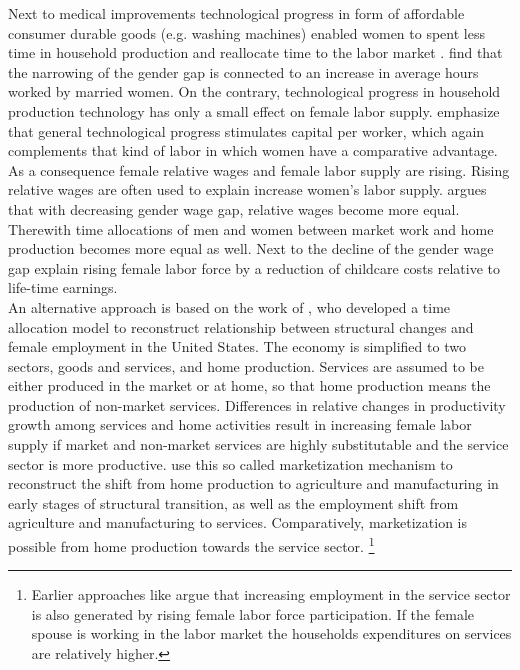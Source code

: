 \documentclass[a4paper,12pt]{article}
\begin{document}
Next to medical improvements technological progress in form of affordable consumer durable goods (e.g. washing machines) enabled women to spent less time in household production and reallocate time to the labor market \citep{Greenwood:2005}. \citet{Jones:2003} find that the narrowing of the gender gap is connected to an increase in average hours worked by married women. On the contrary, technological progress in household production technology has only a small effect on female labor supply.
\citet{Galor:1996} emphasize that general technological progress stimulates capital per worker, which again complements that kind of labor in which women have a comparative advantage. As a consequence female relative wages and female labor supply are rising. Rising relative wages are often used to explain increase women's labor supply. \citet{Siegel:2017} argues that with decreasing gender wage gap, relative wages become more equal. Therewith time allocations of men and women between market work and home production becomes more equal as well. Next to the decline of the gender wage gap \citet{Attanasio:2008} explain rising female labor force by a reduction of childcare costs relative to life-time earnings.\\
An alternative approach is based on the work of \citet{Akbulut:11}, who developed a time allocation model to reconstruct relationship between structural changes and female employment in the United States. The economy is simplified to two sectors, goods and services, and home production. Services are assumed to be either produced in the market or at home, so that home production means the production of non-market services. Differences in relative changes in productivity growth among services and home activities result in increasing female labor supply if market and non-market services are highly substitutable and the service sector is more productive. \citet{Ngai:2008} use this so called marketization mechanism to reconstruct the shift from home production to agriculture and manufacturing in early stages of structural transition, as well as the employment shift from agriculture and manufacturing to services. Comparatively, marketization is possible from home production towards the service sector. \footnote{Earlier approaches like \citet{Fuchs:1980} argue that increasing employment in the service sector is also generated by rising female labor force participation. If the female spouse is working in the labor market the households expenditures on services are relatively higher.}\\
\end{document}

